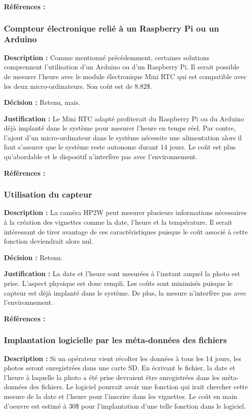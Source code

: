 \textbf{Références :} \cite{Datetime}

\subsubsection{Compteur électronique relié à un Raspberry Pi ou un Arduino}

\textbf{Description :} Comme mentionné précédemment, certaines solutions comprennent l'utilisation d'un Arduino ou d'un Raspberry Pi. Il serait possible de mesurer l'heure avec le module électronique Mini RTC qui est compatible avec les deux micro-ordinateurs. Son coût est de 8.82\$.

\textbf{Décision :} Retenu, mais.

\textbf{Justification :} Le Mini RTC adapté profiterait du Raspberry Pi ou du Arduino déjà implanté dans le système pour mesurer l'heure en temps réel. Par contre, l'ajout d'un micro-ordinateur dans le système nécessite une alimentation alors il faut s'assurer que le système reste autonome durant 14 jours. Le coût est plus qu'abordable et le dispositif n'interfère pas avec l'environnement.

\textbf{Références :} \cite{Timer}

\subsubsection{Utilisation du capteur}

\textbf{Description :} La caméra HP2W peut mesurer plusieurs informations nécessaires à la création des vignettes comme la date, l'heure et la température. Il serait intéressant de tirer avantage de ces caractéristiques puisque le coût associé à cette fonction deviendrait alors nul.

\textbf{Décision :} Retenu.

\textbf{Justification :} La date et l'heure sont mesurées à l'instant auquel la photo est prise. L'aspect physique est donc rempli. Les coûts sont minimisés puisque le capteur est déjà implanté dans le système. De plus, la mesure n'interfère pas avec l'environnement.

\textbf{Références :} \cite{HP2W}

\subsubsection{Implantation logicielle par les méta-données des fichiers}

\textbf{Description :} Si un opérateur vient récolter les données à tous les 14 jours, les photos seront enregistrées dans une carte SD. En écrivant le fichier, la date et l'heure à laquelle la photo a été prise devraient être enregistrées dans les méta-données des fichiers. Le logiciel pourrait avoir une fonction qui irait chercher cette mesure de la date et l'heure pour l'inscrire dans les vignettes. Le coût en main d'oeuvre est estimé à 30\$ pour l'implantation d'une telle fonction dans le logiciel.


